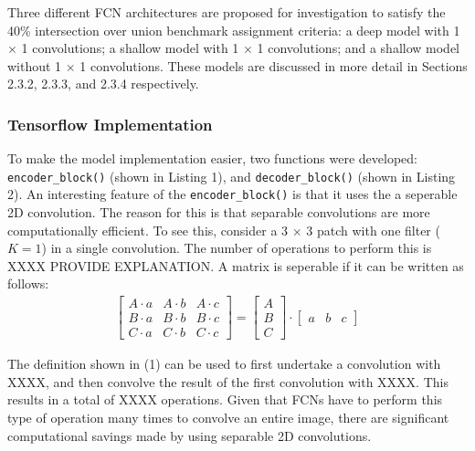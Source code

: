 \documentclass[a4paper]{article}
\begin{document}


Three different FCN architectures are proposed for investigation to satisfy the 40\% intersection over union benchmark assignment criteria: a deep model with 1 $\times$ 1 convolutions; a shallow model with 1 $\times$ 1 convolutions; and a shallow model without 1 $\times$ 1 convolutions. These models are discussed in more detail in Sections 2.3.2, 2.3.3, and 2.3.4 respectively.

\subsubsection{Tensorflow Implementation}
To make the model implementation easier, two functions were developed: \verb|encoder_block()| (shown in Listing 1), and \verb|decoder_block()| (shown in Listing 2). An interesting feature of the \verb|encoder_block()| is that it uses the a seperable 2D convolution. The reason for this is that separable convolutions are more computationally efficient. To see this, consider a 3 $\times$ 3 patch with one filter ($K = 1$) in a single convolution. The number of operations to perform this is XXXX PROVIDE EXPLANATION. A matrix is seperable if it can be written as follows:
\begin{align}
\begin{bmatrix}
A \cdot a & A \cdot b & A \cdot c\\
B \cdot a & B \cdot b & B \cdot c\\
C \cdot a & C \cdot b & C \cdot c
\end{bmatrix}
=
\begin{bmatrix}
A\\
B\\
C
\end{bmatrix}
\cdot
\begin{bmatrix}
a & b & c
\end{bmatrix}
\end{align}  

The definition shown in (1) can be used to first undertake a convolution with XXXX, and then convolve the result of the first convolution with XXXX. This results in a total of XXXX operations. Given that FCNs have to perform this type of operation many times to convolve an entire image, there are significant computational savings made by using separable 2D convolutions.
   
\end{document}
